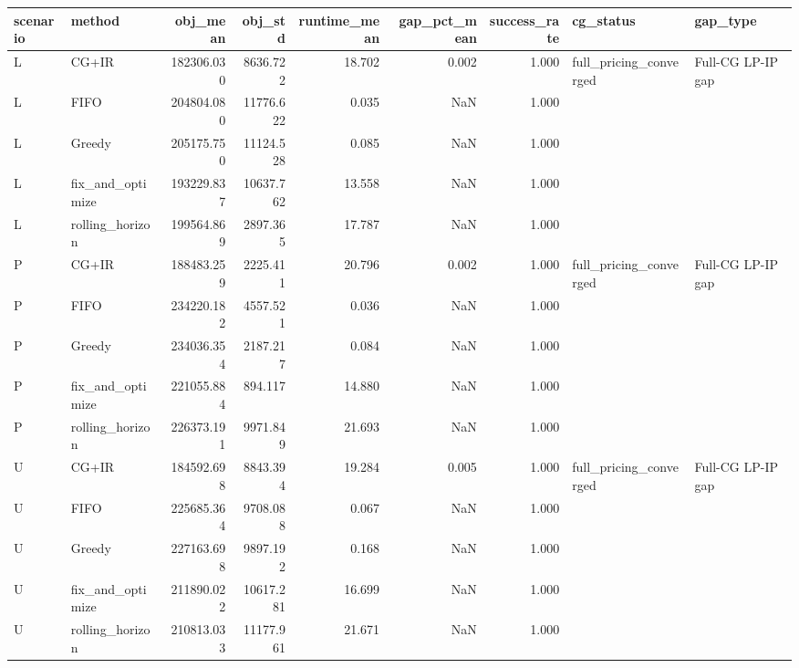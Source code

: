\begin{tabular}{llrrrrrll}
\toprule
scenario & method & obj_mean & obj_std & runtime_mean & gap_pct_mean & success_rate & cg_status & gap_type \\
\midrule
L & CG+IR & 182306.030 & 8636.722 & 18.702 & 0.002 & 1.000 & full_pricing_converged & Full-CG LP-IP gap \\
L & FIFO & 204804.080 & 11776.622 & 0.035 & NaN & 1.000 &  &  \\
L & Greedy & 205175.750 & 11124.528 & 0.085 & NaN & 1.000 &  &  \\
L & fix_and_optimize & 193229.837 & 10637.762 & 13.558 & NaN & 1.000 &  &  \\
L & rolling_horizon & 199564.869 & 2897.365 & 17.787 & NaN & 1.000 &  &  \\
P & CG+IR & 188483.259 & 2225.411 & 20.796 & 0.002 & 1.000 & full_pricing_converged & Full-CG LP-IP gap \\
P & FIFO & 234220.182 & 4557.521 & 0.036 & NaN & 1.000 &  &  \\
P & Greedy & 234036.354 & 2187.217 & 0.084 & NaN & 1.000 &  &  \\
P & fix_and_optimize & 221055.884 & 894.117 & 14.880 & NaN & 1.000 &  &  \\
P & rolling_horizon & 226373.191 & 9971.849 & 21.693 & NaN & 1.000 &  &  \\
U & CG+IR & 184592.698 & 8843.394 & 19.284 & 0.005 & 1.000 & full_pricing_converged & Full-CG LP-IP gap \\
U & FIFO & 225685.364 & 9708.088 & 0.067 & NaN & 1.000 &  &  \\
U & Greedy & 227163.698 & 9897.192 & 0.168 & NaN & 1.000 &  &  \\
U & fix_and_optimize & 211890.022 & 10617.281 & 16.699 & NaN & 1.000 &  &  \\
U & rolling_horizon & 210813.033 & 11177.961 & 21.671 & NaN & 1.000 &  &  \\
\bottomrule
\end{tabular}

